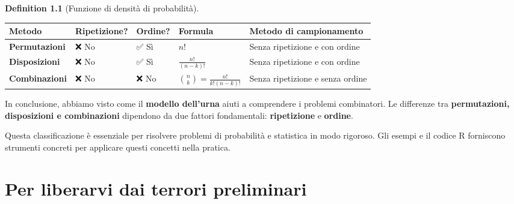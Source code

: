 \documentclass[
  letterpaper,
  DIV=11,
  numbers=noendperiod,
  oneside]{scrreprt}
\theoremstyle{definition}
\theoremstyle{plain}
\theoremstyle{definition}
\newtheorem{definition}{Definition}[chapter]
\theoremstyle{remark}
\begin{document}
\begin{definition}[Funzione di densità di
probabilità]
\begin{longtable}[]{@{}
  >{\raggedright\arraybackslash}p{}
  >{\raggedright\arraybackslash}p{}
  >{\raggedright\arraybackslash}p{}
  >{\raggedright\arraybackslash}p{}
  >{\raggedright\arraybackslash}p{}@{}}
\toprule\noalign{}
\begin{minipage}[b]{\linewidth}\raggedright
Metodo
\end{minipage} & \begin{minipage}[b]{\linewidth}\raggedright
Ripetizione?
\end{minipage} & \begin{minipage}[b]{\linewidth}\raggedright
Ordine?
\end{minipage} & \begin{minipage}[b]{\linewidth}\raggedright
Formula
\end{minipage} & \begin{minipage}[b]{\linewidth}\raggedright
Metodo di campionamento
\end{minipage} \\
\midrule\noalign{}
\endhead
\bottomrule\noalign{}
\endlastfoot
\textbf{Permutazioni} & ❌ No & ✅ Sì & \(n!\) & Senza ripetizione e con
ordine \\
\textbf{Disposizioni} & ❌ No & ✅ Sì & \(\frac{n!}{(n-k)!}\) & Senza
ripetizione e con ordine \\
\textbf{Combinazioni} & ❌ No & ❌ No &
\(\binom{n}{k} = \frac{n!}{k!(n-k)!}\) & Senza ripetizione e senza
ordine \\
\end{longtable}

In conclusione, abbiamo visto come il \textbf{modello dell'urna} aiuti a
comprendere i problemi combinatori. Le differenze tra
\textbf{permutazioni, disposizioni e combinazioni} dipendono da due
fattori fondamentali: \textbf{ripetizione} e \textbf{ordine}.

Questa classificazione è essenziale per risolvere problemi di
probabilità e statistica in modo rigoroso. Gli esempi e il codice R
forniscono strumenti concreti per applicare questi concetti nella
pratica.

\chapter{Per liberarvi dai terrori preliminari}\label{sec-apx-calculus}


\end{definition}
\end{document}
